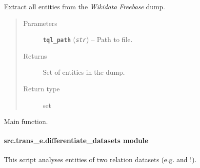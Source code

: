 \documentclass[letterpaper,10pt,english]{sphinxmanual}
\begin{document}

\begin{fulllineitems}
\label{src.trans_e:src.trans_e.contains_entities.extract_entities_from_tql_file}
Extract all entities from the  \emph{Wikidata} \emph{Freebase} dump.
\begin{quote}\begin{description}
\item[{Parameters}] \leavevmode
\textbf{\texttt{tql\_path}} (\emph{\texttt{str}}) -- Path to  file.

\item[{Returns}] \leavevmode
Set of entities in the  dump.

\item[{Return type}] \leavevmode
set

\end{description}\end{quote}

\end{fulllineitems}


\begin{fulllineitems}
\label{src.trans_e:src.trans_e.contains_entities.init_argparse}
\end{fulllineitems}


\begin{fulllineitems}
\label{src.trans_e:src.trans_e.contains_entities.main}
Main function.

\end{fulllineitems}



\paragraph{src.trans\_e.differentiate\_datasets module}
\label{src.trans_e:module-src.trans_e.differentiate_datasets}\label{src.trans_e:src-trans-e-differentiate-datasets-module}
This script analyses entities of two relation datasets (e.g.  and !).
\end{document}
